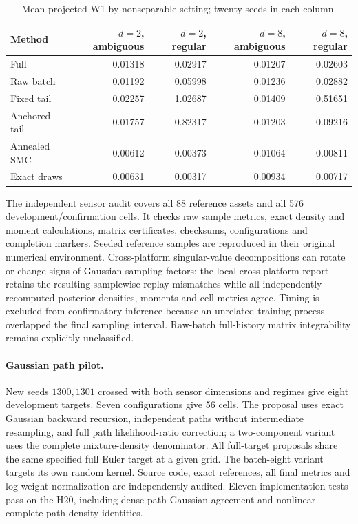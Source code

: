 \begin{table}[h]
\centering\small
\caption{Mean projected W1 by nonseparable setting; twenty seeds in each column.}
\begin{tabular}{lrrrr}
\toprule
Method & $d=2$, ambiguous & $d=2$, regular & $d=8$, ambiguous & $d=8$, regular\\
\midrule
Full & 0.01318 & 0.02917 & 0.01207 & 0.02603\\
Raw batch & 0.01192 & 0.05998 & 0.01236 & 0.02882\\
Fixed tail & 0.02257 & 1.02687 & 0.01409 & 0.51651\\
Anchored tail & 0.01757 & 0.82317 & 0.01203 & 0.09216\\
Annealed SMC & 0.00612 & 0.00373 & 0.01064 & 0.00811\\
Exact draws & 0.00631 & 0.00317 & 0.00934 & 0.00717\\
\bottomrule
\end{tabular}
\end{table}

The independent sensor audit covers all 88 reference assets and all 576 development/confirmation cells. It checks raw sample metrics, exact density and moment calculations, matrix certificates, checksums, configurations and completion markers. Seeded reference samples are reproduced in their original numerical environment. Cross-platform singular-value decompositions can rotate or change signs of Gaussian sampling factors; the local cross-platform report retains the resulting samplewise replay mismatches while all independently recomputed posterior densities, moments and cell metrics agree. Timing is excluded from confirmatory inference because an unrelated training process overlapped the final sampling interval. Raw-batch full-history matrix integrability remains explicitly unclassified.

\paragraph{Gaussian path pilot.}
New seeds $1300,1301$ crossed with both sensor dimensions and regimes give eight development targets. Seven configurations give 56 cells. The proposal uses exact Gaussian backward recursion, independent paths without intermediate resampling, and full path likelihood-ratio correction; a two-component variant uses the complete mixture-density denominator. All full-target proposals share the same specified full Euler target at a given grid. The batch-eight variant targets its own random kernel. Source code, exact references, all final metrics and log-weight normalization are independently audited. Eleven implementation tests pass on the H20, including dense-path Gaussian agreement and nonlinear complete-path density identities.

